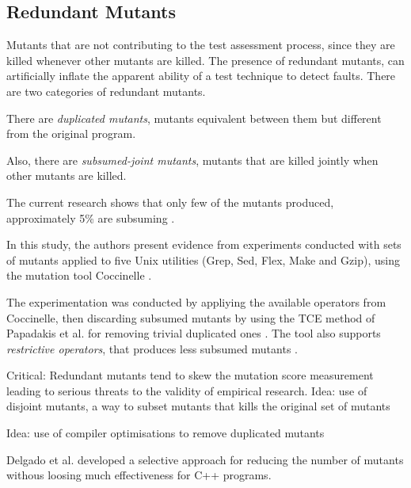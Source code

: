 
\subsection{Redundant Mutants}\label{sub:redundant}

Mutants that are not contributing to the test assessment process, since they are killed whenever other mutants are killed. The presence of redundant mutants, can artificially inflate the apparent ability of a test technique to detect faults.
There are two categories of redundant mutants. 

There are \textit{duplicated mutants}, mutants equivalent between them but different from the original program.

Also, there are \textit{subsumed-joint mutants}, mutants that are killed jointly when other mutants are killed.

The current research shows that only few of the mutants produced, approximately 5\% are subsuming \cite{papadakis2016threats}. 

In this study, the authors present evidence from experiments conducted with sets of mutants applied to five Unix utilities (Grep, Sed, Flex, Make and Gzip), using the mutation tool Coccinelle \cite{padioleau2008documenting}. 

The experimentation was conducted by appliying the available operators from Coccinelle, then discarding subsumed mutants by using the TCE method of Papadakis et al. for removing trivial duplicated ones \cite{papadakis2015trivial}. 
The tool also supports \textit{restrictive operators}, that produces less subsumed mutants \cite{just2012redundant,kaminski2013improving}.

Critical: Redundant mutants tend to skew the mutation score measurement leading to serious threats to the validity of empirical research.
Idea: use of disjoint mutants, a way to subset mutants that kills the original set of mutants

Idea: use of compiler optimisations to remove duplicated mutants

Delgado et al. \cite{delgado2017assessment} developed a selective approach for reducing the number of mutants withous loosing much effectiveness for C++ programs.
	




